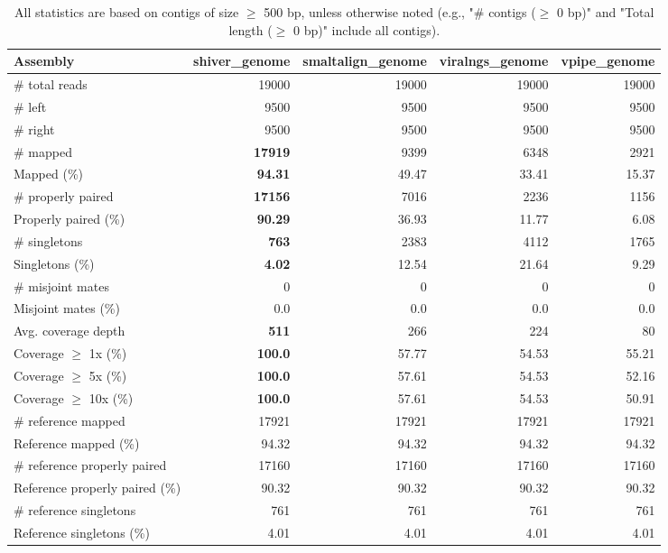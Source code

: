\documentclass[12pt,a4paper]{article}
\begin{document}
\begin{table}[ht]
\begin{center}
\caption{All statistics are based on contigs of size $\geq$ 500 bp, unless otherwise noted (e.g., "\# contigs ($\geq$ 0 bp)" and "Total length ($\geq$ 0 bp)" include all contigs).}
\begin{tabular}{|l*{4}{|r}|}
\hline
Assembly & shiver\_genome & smaltalign\_genome & viralngs\_genome & vpipe\_genome \\ \hline
\# total reads & 19000 & 19000 & 19000 & 19000 \\ \hline
\# left & 9500 & 9500 & 9500 & 9500 \\ \hline
\# right & 9500 & 9500 & 9500 & 9500 \\ \hline
\# mapped & {\bf 17919} & 9399 & 6348 & 2921 \\ \hline
Mapped (\%) & {\bf 94.31} & 49.47 & 33.41 & 15.37 \\ \hline
\# properly paired & {\bf 17156} & 7016 & 2236 & 1156 \\ \hline
Properly paired (\%) & {\bf 90.29} & 36.93 & 11.77 & 6.08 \\ \hline
\# singletons & {\bf 763} & 2383 & 4112 & 1765 \\ \hline
Singletons (\%) & {\bf 4.02} & 12.54 & 21.64 & 9.29 \\ \hline
\# misjoint mates & 0 & 0 & 0 & 0 \\ \hline
Misjoint mates (\%) & 0.0 & 0.0 & 0.0 & 0.0 \\ \hline
Avg. coverage depth & {\bf 511} & 266 & 224 & 80 \\ \hline
Coverage $\geq$ 1x (\%) & {\bf 100.0} & 57.77 & 54.53 & 55.21 \\ \hline
Coverage $\geq$ 5x (\%) & {\bf 100.0} & 57.61 & 54.53 & 52.16 \\ \hline
Coverage $\geq$ 10x (\%) & {\bf 100.0} & 57.61 & 54.53 & 50.91 \\ \hline
\# reference mapped & 17921 & 17921 & 17921 & 17921 \\ \hline
Reference mapped (\%) & 94.32 & 94.32 & 94.32 & 94.32 \\ \hline
\# reference properly paired & 17160 & 17160 & 17160 & 17160 \\ \hline
Reference properly paired (\%) & 90.32 & 90.32 & 90.32 & 90.32 \\ \hline
\# reference singletons & 761 & 761 & 761 & 761 \\ \hline
Reference singletons (\%) & 4.01 & 4.01 & 4.01 & 4.01 \\ \hline

\end{tabular}
\end{center}
\end{table}
\end{document}
